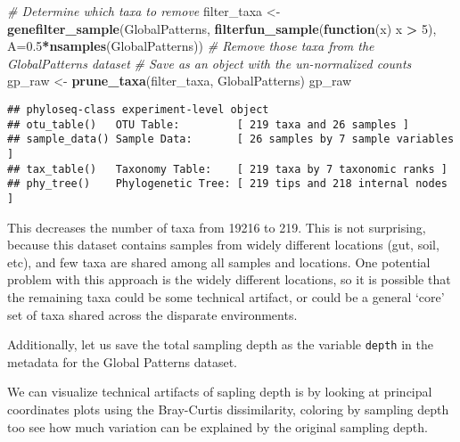 \documentclass[
]{book}
\newenvironment{Shaded}{\begin{snugshade}}{\end{snugshade}}
\newcommand{\CommentTok}[1]{\textcolor[rgb]{0.56,0.35,0.01}{\textit{#1}}}
\newcommand{\ControlFlowTok}[1]{\textcolor[rgb]{0.13,0.29,0.53}{\textbf{#1}}}
\newcommand{\DataTypeTok}[1]{\textcolor[rgb]{0.13,0.29,0.53}{#1}}
\newcommand{\DecValTok}[1]{\textcolor[rgb]{0.00,0.00,0.81}{#1}}
\newcommand{\FloatTok}[1]{\textcolor[rgb]{0.00,0.00,0.81}{#1}}
\newcommand{\KeywordTok}[1]{\textcolor[rgb]{0.13,0.29,0.53}{\textbf{#1}}}
\newcommand{\NormalTok}[1]{#1}
\newcommand{\OperatorTok}[1]{\textcolor[rgb]{0.81,0.36,0.00}{\textbf{#1}}}
\newcommand{\StringTok}[1]{\textcolor[rgb]{0.31,0.60,0.02}{#1}}
\begin{document}
\begin{Shaded}
\begin{Highlighting}[]
\CommentTok{\# Determine which taxa to remove}
\NormalTok{filter\_taxa \textless{}{-}}\StringTok{ }\KeywordTok{genefilter\_sample}\NormalTok{(GlobalPatterns,}
                                 \KeywordTok{filterfun\_sample}\NormalTok{(}\ControlFlowTok{function}\NormalTok{(x) x }\OperatorTok{\textgreater{}}\StringTok{ }\DecValTok{5}\NormalTok{),}
                                 \DataTypeTok{A=}\FloatTok{0.5}\OperatorTok{*}\KeywordTok{nsamples}\NormalTok{(GlobalPatterns))}
\CommentTok{\# Remove those taxa from the GlobalPatterns dataset}
\CommentTok{\# Save as an object with the un{-}normalized counts}
\NormalTok{gp\_raw \textless{}{-}}\StringTok{ }\KeywordTok{prune\_taxa}\NormalTok{(filter\_taxa, GlobalPatterns)}
\NormalTok{gp\_raw}
\end{Highlighting}
\end{Shaded}

\begin{verbatim}
## phyloseq-class experiment-level object
## otu_table()   OTU Table:         [ 219 taxa and 26 samples ]
## sample_data() Sample Data:       [ 26 samples by 7 sample variables ]
## tax_table()   Taxonomy Table:    [ 219 taxa by 7 taxonomic ranks ]
## phy_tree()    Phylogenetic Tree: [ 219 tips and 218 internal nodes ]
\end{verbatim}

This decreases the number of taxa from 19216 to 219. This is not surprising, because this dataset contains samples from widely different locations (gut, soil, etc), and few taxa are shared among all samples and locations. One potential problem with this approach is the widely different locations, so it is possible that the remaining taxa could be some technical artifact, or could be a general `core' set of taxa shared across the disparate environments.

Additionally, let us save the total sampling depth as the variable \texttt{depth} in the metadata for the Global Patterns dataset.

\begin{Shaded}
\end{Shaded}

We can visualize technical artifacts of sapling depth is by looking at principal coordinates plots using the Bray-Curtis dissimilarity, coloring by sampling depth too see how much variation can be explained by the original sampling depth.
\end{document}
